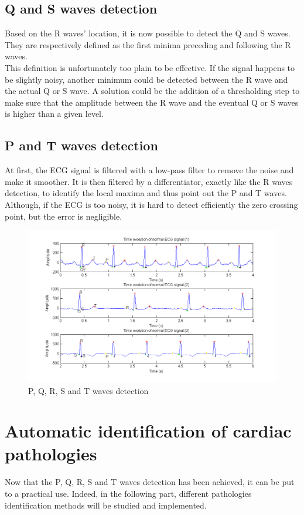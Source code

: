 \documentclass[11pt]{article}
\begin{document}
	\subsection{Q and S waves detection}
		Based on the R waves' location, it is now possible to detect the Q and S waves. They are respectively defined as the first minima preceding and following the R waves.\\
		This definition is unfortunately too plain to be effective. If the signal happens to be slightly noisy, another minimum could be detected between the R wave and the actual Q or S wave. A solution could be the addition of a thresholding step to make sure that the amplitude between the R wave and the eventual Q or S waves is higher than a given level.
	\subsection{P and T waves detection}
		At first, the ECG signal is filtered with a low-pass filter to remove the noise and make it smoother. It is then filtered by a differentiator, exactly like the R waves detection, to identify the local maxima and thus point out the P and T waves.\\
		Although, if the ECG is too noisy, it is hard to detect efficiently the zero crossing point, but the error is negligible.\\
			\begin{figure}[h]
				\centering
				\includegraphics[scale=0.5]{images/Q42_4.png}
				\caption{P, Q, R, S and T waves detection}
				\label{Q412}
			\end{figure}


\section{Automatic identification of cardiac pathologies}
	Now that the P, Q, R, S and T waves detection has been achieved, it can be put to a practical use. Indeed, in the following part, different pathologies identification methods will be studied and implemented.
\end{document}
